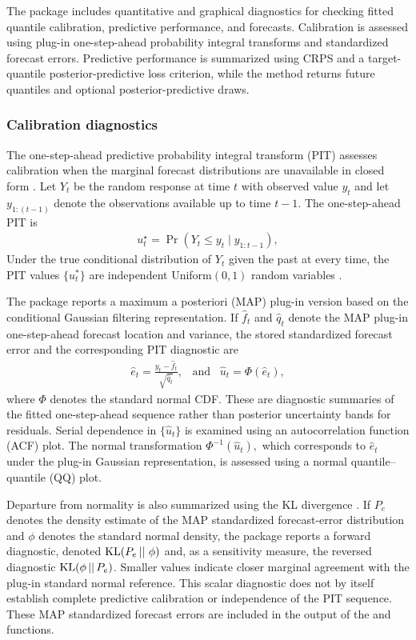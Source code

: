 The package includes quantitative and graphical diagnostics for checking fitted quantile calibration, predictive performance, and forecasts.
Calibration is assessed using plug-in one-step-ahead probability integral transforms and standardized forecast errors. Predictive performance is summarized using CRPS and a target-quantile posterior-predictive loss criterion, while the  method returns future quantiles and optional posterior-predictive draws.

\subsubsection{Calibration diagnostics}
The one-step-ahead predictive probability integral transform (PIT) assesses
calibration when the marginal forecast distributions are unavailable in closed
form \citep{exd-rosenblatt1952remarks,exd-huerta2003time,exd-prado2006multivariate}.
Let $Y_t$ be the random response at time $t$ with observed value $y_t$ and let
$y_{1:(t-1)}$ denote the observations available up to time $t-1.$ The
one-step-ahead PIT is
\begin{align}
u_t^\star = \Pr(Y_t \leq y_t \mid y_{1:t-1}),
\label{exd:eq:pit_ideal}
\end{align}
 Under the true conditional distribution of $Y_t$
  given the past at every time, the PIT values $\{u_t^*\}$ are independent Uniform$(0,1)$ random variables \citep{exd-rosenblatt1952remarks}.

  The package reports a maximum a posteriori (MAP) plug-in version based on the conditional Gaussian filtering representation. If \(\hat f_t\) and \(\hat q_t\) denote the MAP plug-in one-step-ahead forecast location and variance, the stored standardized forecast error and the corresponding PIT diagnostic are
\begin{align}
\hat e_t =
\frac{y_t-\hat f_t}{\sqrt{\hat q_t}}, \;\;\; \text{and}
\label{exd:eq:standardized_error}
\;\;\;
\hat{u}_t = \Phi(\hat e_t),
\end{align}
where $\Phi$ denotes the standard normal CDF. These are diagnostic summaries of the fitted one-step-ahead sequence rather than posterior uncertainty bands for residuals.
Serial dependence in $\{\hat u_t\}$ is examined using an autocorrelation function (ACF) plot. The normal transformation $\Phi^{-1}(\hat{u}_t),$ which corresponds to $\hat{e}_t$ under the plug-in Gaussian representation, is assessed using a normal quantile--quantile (QQ) plot.

Departure from normality is also summarized using the KL divergence \citep{exd-kullback1951information}.
If $P_e$ denotes the density estimate of the MAP standardized forecast-error distribution and $\phi$ denotes the standard normal density, the package reports a forward diagnostic, denoted $\KL(P_e\,|| \ \phi)$ and, as a sensitivity measure, the reversed diagnostic $\operatorname{KL}(\phi \,||\,P_e)$.
Smaller values indicate closer marginal agreement with the plug-in standard
normal reference. This scalar diagnostic does not by itself establish complete
predictive calibration or independence of the PIT sequence.
These MAP standardized forecast errors are included in the output of the  and  functions.

